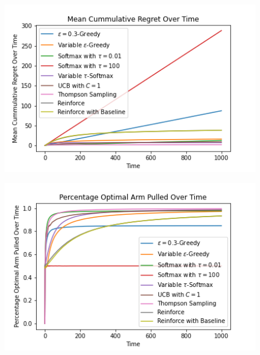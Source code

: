 \documentclass{article}
\begin{document}
		\begin{figure}[H]
			\graphicspath{ {../Experiments/Normal_2_0.01_every_case/} }
			\centering
			\begin{minipage}{.5\textwidth}
			  \centering
			  \includegraphics[width=\linewidth]{Mean_Cummulative_Regret_Over_Time.png}
			  \label{fig:test1}
			\end{minipage}%
			\begin{minipage}{.5\textwidth}
			  \centering
			  \includegraphics[width=\linewidth]{Percentage_Optimal_Arm_Pulled_Over_Time.png}
			  \label{fig:test2}
			\end{minipage}
			\end{figure}
			
\end{document}
